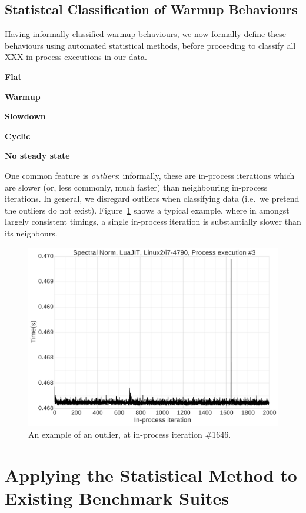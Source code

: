\documentclass[preprint,numbers,10pt]{sigplanconf}
\begin{document}

\subsection{Statistcal Classification of Warmup Behaviours}

Having informally classified warmup behaviours, we now formally define these
behaviours using automated statistical methods, before proceeding to classify
all XXX in-process executions in our data.


\textbf{Flat}

\textbf{Warmup}

\textbf{Slowdown}

\textbf{Cyclic}

\textbf{No steady state}

One common feature is \emph{outliers}: informally, these are in-process
iterations which are slower (or, less commonly, much faster) than neighbouring
in-process iterations. In general, we disregard outliers when classifying data
(i.e.~we pretend the outliers do not exist).
Figure~\ref{fig:examples:outliers1} shows a typical example, where in amongst
largely consistent timings, a single in-process iteration is substantially
slower than its neighbours.


\begin{figure}[tbp]
\includegraphics[width=.475\textwidth]{examples/outliers1}
\caption{An example of an outlier, at in-process iteration \#1646.}
\label{fig:examples:outliers1}
\end{figure}

\section{Applying the Statistical Method to Existing Benchmark Suites}
\end{document}
